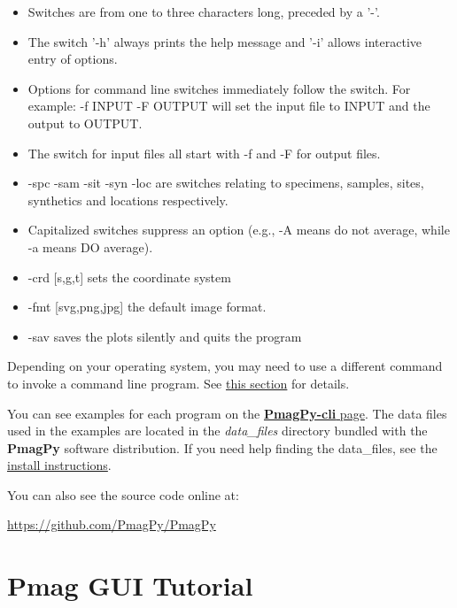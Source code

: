 \documentclass[11pt]{book}
\begin{document}
{{\begin{itemize}
\item Switches are from one to three characters long, preceded by a '-'.
\item The switch '-h' always prints the help message and '-i' allows interactive entry of options.
\item  Options for command line switches immediately follow the switch.  For example:  -f INPUT -F OUTPUT will set the input file to INPUT and the output to OUTPUT.
\item  The switch for input  files all start with -f and -F for output files.
\item -spc -sam -sit -syn  -loc are switches relating to specimens, samples, sites, synthetics and locations respectively.
\item Capitalized switches suppress an option (e.g., -A means do not average, while -a means DO average).
\item -crd [s,g,t] sets the coordinate system
\item -fmt [svg,png,jpg] the default image format.
\item -sav  saves the plots silently and quits the program
\end{itemize}
\newcommand{\stt}{\small\tt}
\newcount\exnum
\outer{}


Depending on your operating system, you  may need to use a different command to invoke a command line program.  See \href{#which_command}{this section} for details.

You can see examples for each program on the \href{http://pmagpy.github.io/PmagPy-cli.html}{{\bf PmagPy-cli} page}. The data files used in the examples are located in the {\it data\_files} directory bundled with the {\bf PmagPy} software distribution.  If you need help finding the data\_files, see the \href{#getting_python}{install instructions}.

You can also see the source code online at:


 \url{https://github.com/PmagPy/PmagPy}



\chapter{Pmag GUI Tutorial}
\label{chap:Pmag GUI}

}}
\end{document}

